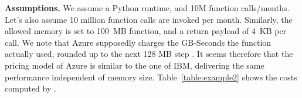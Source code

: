 %
\textbf{Assumptions.} We assume a Python runtime, and 10M function calls/months.
Let's also assume 10 million function calls are invoked per month. 
Similarly, the allowed memory is set to 100~\gls{MB} function, and a return payload of 4~KB per call.
We note that Azure supposedly charges the GB-Seconds the function actually used, rounded up to the next 128 \gls{MB} step \cite{AzurePricing}. 
It seems therefore that the pricing model of Azure is similar to the one of \gls{IBM}, delivering the same performance independent of memory size.
Table~\ref{table:example2} shows the costs computed by \sys. 
